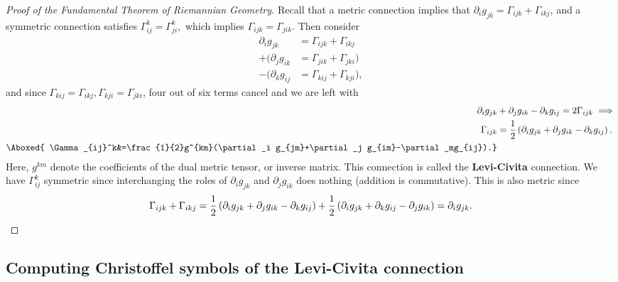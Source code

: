 \begin{proof}[Proof of the Fundamental Theorem of Riemannian Geometry]
    Recall that a metric connection implies that $\partial _i g_{jk}=\Gamma _{ijk}+\Gamma _{ikj}$, and a symmetric connection satisfies $\Gamma _{ij}^k=\Gamma _{ji}^k, $ which implies $\Gamma _{ijk}=\Gamma _{jik}$. Then consider
    \begin{align*}
        \partial _i g_{jk}&=\Gamma _{ijk}+\Gamma _{ikj}\\
    +(\partial _j g_{ik}&=\Gamma _{jik}+\Gamma _{jki})\\
    -(\partial _k g_{ij}&=\Gamma _{kij}+\Gamma _{kji}),
    \end{align*} and since $\Gamma _{kij}=\Gamma _{ikj},\Gamma _{kji}=\Gamma _{jki}$, four out of six terms cancel and we are left with 
    \begin{align*}
        \partial _i g_{jk}&+\partial _j g_{ik}-\partial _kg_{ij}=2\Gamma _{ijk} \implies \\
        \Gamma _{ijk}&=\frac{1}{2}\left( \partial _i g_{jk}+\partial _j g_{ik}-\partial _kg_{ij}\right), \\
        \Aboxed{ \Gamma _{ij}^k&=\frac{1}{2}g^{km}(\partial _i g_{jm}+\partial _j g_{im}-\partial _mg_{ij}).}
    \end{align*}
    Here, $g^{km}$ denote the coefficients of the dual metric tensor, or inverse matrix. This connection is called the \textbf{Levi-Civita} connection. We have $\Gamma _{ij}^k$ symmetric since interchanging the roles of $\partial _i g_{jk}$ and $\partial _j g_{ik}$ does nothing (addition is commutative). This is also metric since \[
        \Gamma _{ijk}+\Gamma _{ikj}=\frac{1}{2}\left( \partial _i g_{jk}+\partial _j g_{ik}-\partial _kg_{ij}\right)+\frac{1}{2}\left( \partial _i g_{jk}+\partial _k g_{ij}-\partial _jg_{ik}\right)=\partial _i g_{jk}.\qedhere
    \] 
\end{proof}

\subsection{Computing Christoffel symbols of the Levi-Civita connection}

